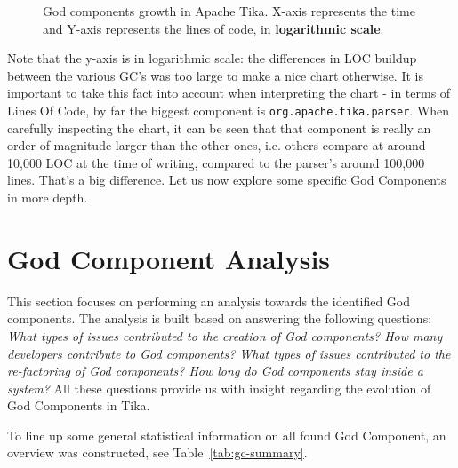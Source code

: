 \documentclass{article}
\begin{document}
\begin{figure}[ht]
    \centering
    
    \label{fig:loc_growth}
    \caption{God components growth in Apache Tika. X-axis represents the time and Y-axis represents the lines of code, in \textbf{logarithmic scale}.}
\end{figure}

Note that the y-axis is in logarithmic scale: the differences in LOC buildup between the various GC's was too large to make a nice chart otherwise. It is important to take this fact into account when interpreting the chart - in terms of Lines Of Code, by far the biggest component is \texttt{org.apache.tika.parser}. When carefully inspecting the chart, it can be seen that that component is really an order of magnitude larger than the other ones, i.e. others compare at around 10,000 LOC at the time of writing, compared to the parser's around 100,000 lines. That's a big difference. Let us now explore some specific God Components in more depth.

\section{God Component Analysis}
This section focuses on performing an analysis towards the identified God components. The analysis is built based on answering the following questions: \textit{What types of issues contributed to the creation of God components? How many developers contribute to God components? What types of issues contributed to the re-factoring of God components? How long do God components stay inside a system?} All these questions provide us with insight regarding the evolution of God Components in Tika.

To line up some general statistical information on all found God Component, an overview was constructed, see Table~\ref{tab:gc-summary}.
\end{document}
